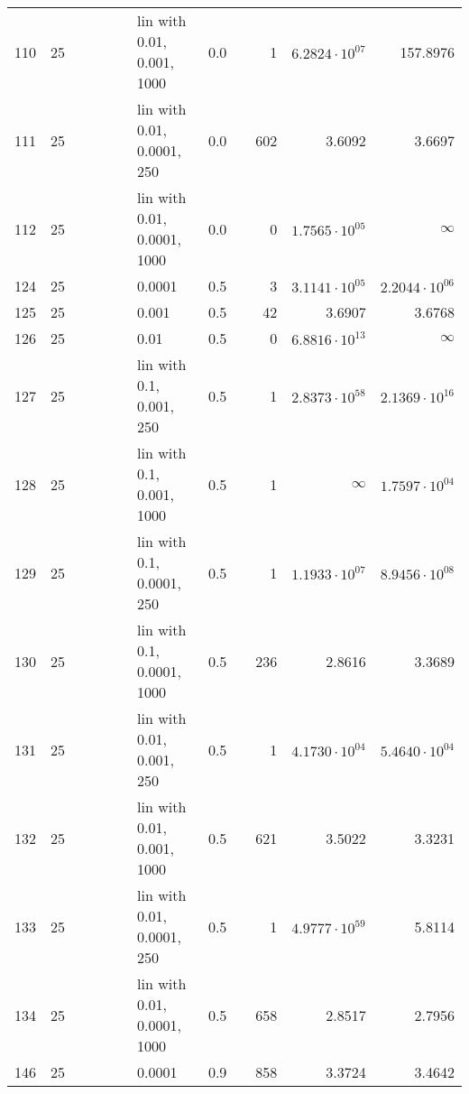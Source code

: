 \begin{longtable}{lrrrrrlrrrrr}
  110 &      25 &   &   &   &   &  lin with 0.01, 0.001, 1000 &      0.0 &        &       1 &  $6.2824\cdot 10^{07}$ &               157.8976 \\
  111 &      25 &   &   &   &   &  lin with 0.01, 0.0001, 250 &      0.0 &        &     602 &                 3.6092 &                 3.6697 \\
  112 &      25 &   &   &   &   & lin with 0.01, 0.0001, 1000 &      0.0 &        &       0 &  $1.7565\cdot 10^{05}$ &               $\infty$ \\
  124 &      25 &   &   &   &   &                      0.0001 &      0.5 &        &       3 &  $3.1141\cdot 10^{05}$ &  $2.2044\cdot 10^{06}$ \\
  125 &      25 &   &   &   &   &                       0.001 &      0.5 &        &      42 &                 3.6907 &                 3.6768 \\
  126 &      25 &   &   &   &   &                        0.01 &      0.5 &        &       0 &  $6.8816\cdot 10^{13}$ &               $\infty$ \\
  127 &      25 &   &   &   &   &    lin with 0.1, 0.001, 250 &      0.5 &        &       1 &  $2.8373\cdot 10^{58}$ &  $2.1369\cdot 10^{16}$ \\
  128 &      25 &   &   &   &   &   lin with 0.1, 0.001, 1000 &      0.5 &        &       1 &               $\infty$ &  $1.7597\cdot 10^{04}$ \\
  129 &      25 &   &   &   &   &   lin with 0.1, 0.0001, 250 &      0.5 &        &       1 &  $1.1933\cdot 10^{07}$ &  $8.9456\cdot 10^{08}$ \\
  130 &      25 &   &   &   &   &  lin with 0.1, 0.0001, 1000 &      0.5 &        &     236 &                 2.8616 &                 3.3689 \\
  131 &      25 &   &   &   &   &   lin with 0.01, 0.001, 250 &      0.5 &        &       1 &  $4.1730\cdot 10^{04}$ &  $5.4640\cdot 10^{04}$ \\
  132 &      25 &   &   &   &   &  lin with 0.01, 0.001, 1000 &      0.5 &        &     621 &                 3.5022 &                 3.3231 \\
  133 &      25 &   &   &   &   &  lin with 0.01, 0.0001, 250 &      0.5 &        &       1 &  $4.9777\cdot 10^{59}$ &                 5.8114 \\
  134 &      25 &   &   &   &   & lin with 0.01, 0.0001, 1000 &      0.5 &        &     658 &                 2.8517 &                 2.7956 \\
  146 &      25 &   &   &   &   &                      0.0001 &      0.9 &        &     858 &                 3.3724 &                 3.4642 \\

\end{longtable}
